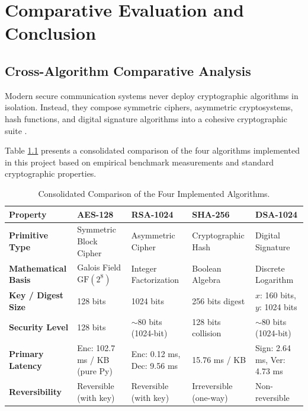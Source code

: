 \chapter{Comparative Evaluation and Conclusion}
\label{ch:evaluation}

\section{Cross-Algorithm Comparative Analysis}
Modern secure communication systems never deploy cryptographic algorithms in isolation. Instead, they compose symmetric ciphers, asymmetric cryptosystems, hash functions, and digital signature algorithms into a cohesive cryptographic suite \cite{stallings}.

Table \ref{tab:comparison_summary} presents a consolidated comparison of the four algorithms implemented in this project based on empirical benchmark measurements and standard cryptographic properties.

\begin{table}[htbp]
\centering
\caption{Consolidated Comparison of the Four Implemented Algorithms.}
\label{tab:comparison_summary}
\small
\begin{tabularx}{\linewidth}{lXXXX}
\toprule
\textbf{Property} & \textbf{AES-128} & \textbf{RSA-1024} & \textbf{SHA-256} & \textbf{DSA-1024} \\
\midrule
\textbf{Primitive Type} & Symmetric Block Cipher & Asymmetric Cipher & Cryptographic Hash & Digital Signature \\
\textbf{Mathematical Basis} & Galois Field $\text{GF}(2^8)$ & Integer Factorization & Boolean Algebra & Discrete Logarithm \\
\textbf{Key / Digest Size} & 128 bits & 1024 bits & 256 bits digest & $x$: 160 bits, $y$: 1024 bits \\
\textbf{Security Level} & 128 bits & $\sim 80$ bits (1024-bit) & 128 bits collision & $\sim 80$ bits (1024-bit) \\
\textbf{Primary Latency} & Enc: 102.7 ms / KB (pure Py) & Enc: 0.12 ms, Dec: 9.56 ms & 15.76 ms / KB & Sign: 2.64 ms, Ver: 4.73 ms \\
\textbf{Reversibility} & Reversible (with key) & Reversible (with key) & Irreversible (one-way) & Non-reversible \\
\bottomrule
\end{tabularx}
\end{table}

